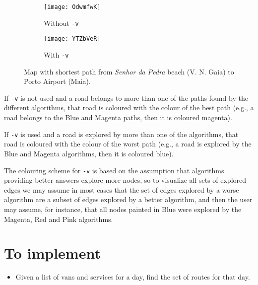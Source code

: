 \begin{figure}[h]
    \centering
    \begin{subfigure}{.49\textwidth}
        \centering
        \texttt{[image: OdwmfwK]}
        \caption{Without \texttt{-v}}
    \end{subfigure}
    \begin{subfigure}{.49\textwidth}
        \centering
        \texttt{[image: YTZbVeR]}
        \caption{With \texttt{-v}}
    \end{subfigure}
    \caption{Map with shortest path from \textit{Senhor da Pedra} beach (V. N. Gaia) to Porto Airport (Maia).}
\end{figure}

If \texttt{-v} is not used and a road belongs to more than one of the paths found by the different algorithms, that road is coloured with the colour of the best path (e.g., a road belongs to the Blue and Magenta paths, then it is coloured magenta).\par
If \texttt{-v} is used and a road is explored by more than one of the algorithms, that road is coloured with the colour of the worst path (e.g., a road is explored by the Blue and Magenta algorithms, then it is coloured blue).\par
The colouring scheme for \texttt{-v} is based on the assumption that algorithms providing better answers explore more nodes, so to visualize all sets of explored edges we may assume in most cases that the set of edges explored by a worse algorithm are a subset of edges explored by a better algorithm, and then the user may assume, for instance, that all nodes painted in Blue were explored by the Magenta, Red and Pink algorithms.
\section{To implement}
\begin{itemize}
    \item Given a list of vans and services for a day, find the set of routes for that day.
\end{itemize}
